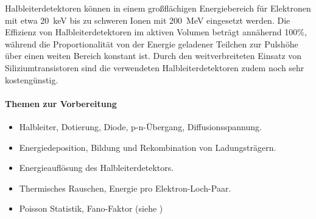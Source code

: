 Halbleiterdetektoren können in einem großflächigen Energiebereich für Elektronen mit etwa 20~keV bis zu schweren Ionen mit 200~MeV eingesetzt werden. Die Effizienz von Halbleiterdetektoren im aktiven Volumen beträgt annähernd 100\%, während die Proportionalität von der Energie geladener Teilchen zur Pulshöhe über einen weiten Bereich konstant ist. Durch den weitverbreiteten Einsatz von Siliziumtransistoren sind die verwendeten Halbleiterdetektoren zudem noch sehr kostengünstig.

\paragraph{Themen zur Vorbereitung}
\begin{itemize}
	\item Halbleiter, Dotierung, Diode, p-n-Übergang, Diffusionsspannung.
	\item Energiedeposition, Bildung und Rekombination von Ladungsträgern.
	\item Energieauflösung des Halbleiterdetektors.
	\item Thermisches Rauschen, Energie pro Elektron-Loch-Paar.
	\item Poisson Statistik, Fano-Faktor (siehe \cite[Kap. 17.10.2]{kolanoski})
\end{itemize}



